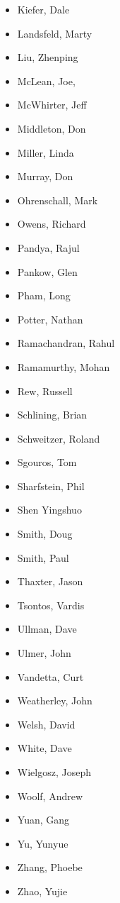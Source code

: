 \begin{itemize}
  \item Kiefer, Dale
  \item Landsfeld, Marty
  \item Liu, Zhenping
  \item McLean, Joe,
  \item McWhirter, Jeff
  \item Middleton, Don
  \item Miller, Linda
  \item Murray, Don
  \item Ohrenschall, Mark
  \item Owens, Richard
  \item Pandya, Rajul
  \item Pankow, Glen
  \item Pham, Long
  \item Potter, Nathan 
  \item Ramachandran, Rahul
  \item Ramamurthy, Mohan
  \item Rew, Russell
  \item Schlining, Brian
  \item Schweitzer, Roland 
  \item Sgouros, Tom
  \item Sharfstein, Phil
  \item Shen Yingshuo
  \item Smith, Doug
  \item Smith, Paul
  \item Thaxter, Jason
  \item Tsontos, Vardis
  \item Ullman, Dave
  \item Ulmer, John
  \item Vandetta, Curt
  \item Weatherley, John
  \item Welsh, David
  \item White, Dave
  \item Wielgosz, Joseph 
  \item Woolf, Andrew
  \item Yuan, Gang
  \item Yu, Yunyue
  \item Zhang, Phoebe
  \item Zhao, Yujie
\end{itemize}

%
%
%
%
%
%

